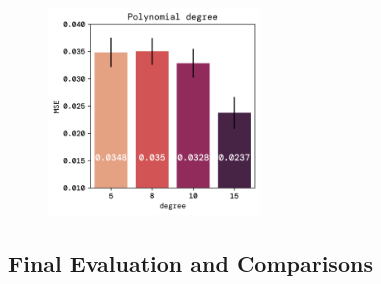 \documentclass[twoside,11pt]{report}
\begin{document}
    \begin{figure}
        \begin{center}
            \includegraphics[width=0.5\textwidth]{../runsAndFigures/MSE_degree.png}
        \end{center}
        \caption{}\label{fig:}
    \end{figure}



\subsection*{Final Evaluation and Comparisons}
\label{sec:comparisons2}
\end{document}
